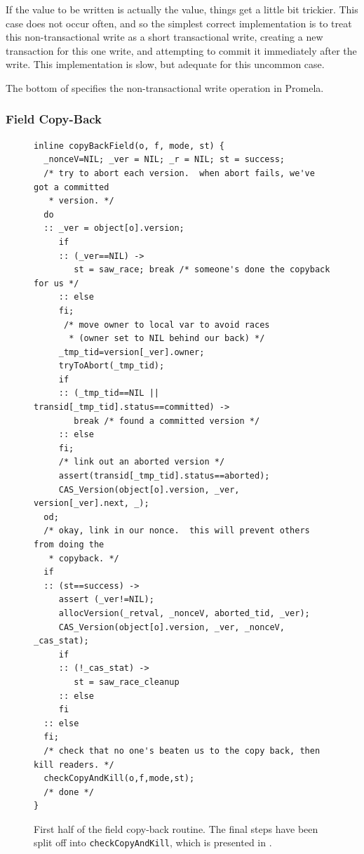 If the value to be written is actually the \FLAG value, things get a
little bit trickier.  This case does not occur often, and so the
simplest correct implementation is to treat this non-transactional
write as a short transactional write, creating a new transaction for
this one write, and attempting to commit it immediately after the
write.  This implementation is slow, but adequate for this uncommon case.

The bottom of  specifies the non-transactional
write operation in Promela.

\subsubsection{Field Copy-Back}\label{sec:copyback}
\begin{figure}\sis\fontsize{9}{10}
\begin{verbatim}
inline copyBackField(o, f, mode, st) {
  _nonceV=NIL; _ver = NIL; _r = NIL; st = success;
  /* try to abort each version.  when abort fails, we've got a committed
   * version. */
  do
  :: _ver = object[o].version;
     if
     :: (_ver==NIL) ->
        st = saw_race; break /* someone's done the copyback for us */
     :: else
     fi;
      /* move owner to local var to avoid races
       * (owner set to NIL behind our back) */
     _tmp_tid=version[_ver].owner;
     tryToAbort(_tmp_tid);
     if
     :: (_tmp_tid==NIL || transid[_tmp_tid].status==committed) ->
        break /* found a committed version */
     :: else
     fi;
     /* link out an aborted version */
     assert(transid[_tmp_tid].status==aborted);
     CAS_Version(object[o].version, _ver, version[_ver].next, _);
  od;
  /* okay, link in our nonce.  this will prevent others from doing the
   * copyback. */
  if
  :: (st==success) ->
     assert (_ver!=NIL);
     allocVersion(_retval, _nonceV, aborted_tid, _ver);
     CAS_Version(object[o].version, _ver, _nonceV, _cas_stat);
     if
     :: (!_cas_stat) ->
        st = saw_race_cleanup
     :: else
     fi
  :: else
  fi;
  /* check that no one's beaten us to the copy back, then kill readers. */
  checkCopyAndKill(o,f,mode,st);
  /* done */
}
\end{verbatim}
\caption[First half of the field copy-back routine.]
{First half of the field copy-back routine.  The final steps
  have been split off into \texttt{checkCopyAndKill}, which is
  presented in .}\label{fig:copyback1}
\end{figure}
